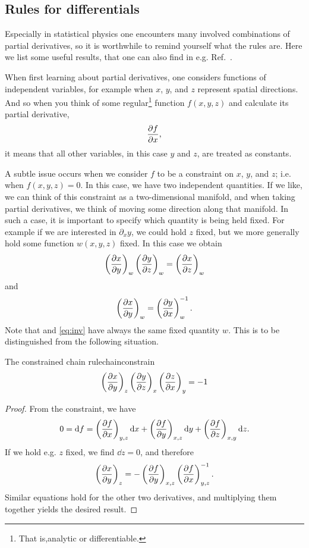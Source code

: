 \subsection{Rules for differentials}

Especially in statistical physics one encounters many involved combinations
of partial derivatives, so it is worthwhile to remind yourself what the
rules are. Here we list some useful results, that one can also
find in e.g. Ref.~\cite{huang_introduction_2001}.

When first learning about partial derivatives, one considers functions
of independent variables, for example when $x$, $y$, and $z$ represent
spatial directions. And so when you think of some
regular\footnote{That is,analytic or differentiable.} 
function $f(x,y,z)$
and calculate its partial derivative,
\begin{equation}
\pdv{f}{x},
\end{equation}
it means that all other variables, in this case $y$ and $z$, are treated as
constants.


A subtle issue occurs when we consider $f$ to be a constraint on $x$, $y$,
and $z$; i.e. when $f(x,y,z)=0$. In this case, we have two independent
quantities. If we like, we can think of this constraint as a two-dimensional
manifold, and when taking partial derivatives, we think of moving some direction
along that manifold. In such a case, it is important to specify which quantity
is being held fixed. For example if we are interested in $\partial_x y$, we
could hold $z$ fixed, but we more generally hold some function
$w(x,y,z)$ fixed. In this case we obtain
\begin{equation}\label{eq:chainw}
\left(\pdv{x}{y}\right)_w
\left(\pdv{y}{z}\right)_w
=\left(\pdv{x}{z}\right)_w
\end{equation}
and
\begin{equation}\label{eq:inv}
\left(\pdv{x}{y}\right)_w
=\left(\pdv{y}{x}\right)_w^{-1}.
\end{equation}
Note that  and \eqref{eq:inv} have always the same
fixed quantity $w$. This is to be distinguished from the following
situation.

\begin{proposition}{The constrained chain rule}{chainconstrain}
$$
\left(\pdv{x}{y}\right)_z
\left(\pdv{y}{z}\right)_x
\left(\pdv{z}{x}\right)_y
=-1
$$
\begin{proof}
From the constraint, we have
\begin{equation*}
0=\dd f=
 \left(\pdv{f}{x}\right)_{y,z}\dd x
+\left(\pdv{f}{y}\right)_{x,z}\dd y
+\left(\pdv{f}{z}\right)_{x,y}\dd z.
\end{equation*}
If we hold e.g. $z$ fixed, we find $\dd z=0$, and therefore
\begin{equation*}
\left(\pdv{x}{y}\right)_z=-\left(\pdv{f}{y}\right)_{x,z}\left(\pdv{f}{x}\right)_{y,z}^{-1}.
\end{equation*}
Similar equations hold for the other two derivatives, and multiplying them
together yields the desired result.
\end{proof}
\end{proposition}
                         

